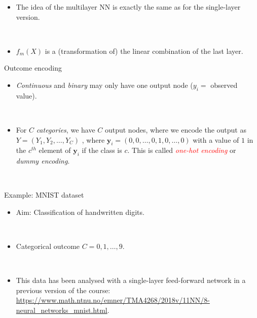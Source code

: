 \documentclass[
  10pt,
  ignorenonframetext,
  twocolumn]{beamer}
\providecommand{\tightlist}{%
  \setlength{\itemsep}{0pt}\setlength{\parskip}{0pt}}
\begin{document}
\begin{frame}
\begin{itemize}
\tightlist
\item
  The idea of the multilayer NN is exactly the same as for the
  single-layer version.
\end{itemize}

\(~\)

\begin{itemize}
\tightlist
\item
  \(f_m(X)\) is a (transformation of) the linear combination of the last
  layer.
\end{itemize}
\end{frame}

\begin{frame}
\begin{block}{Outcome encoding}
\label{outcome-encoding}
\(~\)

\begin{itemize}
\tightlist
\item
  \emph{Continuous} and \emph{binary} may only have one output node
  (\(y_i=\) observed value).
\end{itemize}

\(~\)

\begin{itemize}
\tightlist
\item
  For \(C\) \emph{categories}, we have \(C\) output nodes, where we
  encode the output as \(Y = (Y_1, Y_2, \ldots, Y_C)\) , where
  \({\boldsymbol y}_i=(0,0,\ldots,0,1,0,\ldots,0)\) with a value of
  \(1\) in the \(c^{th}\) element of \({\boldsymbol y}_i\) if the class
  is \(c\). This is called \emph{\textcolor{red}{one-hot encoding}} or
  \emph{dummy encoding}.
\end{itemize}

\(~\)
\end{block}
\end{frame}

\begin{frame}
\begin{block}{Example: MNIST dataset}
\label{example-mnist-dataset}
\(~\)

\begin{itemize}
\tightlist
\item
  Aim: Classification of handwritten digits.
\end{itemize}

\(~\)

\begin{itemize}
\tightlist
\item
  Categorical outcome \(C=0,1,\ldots,9\).
\end{itemize}

\(~\)

\begin{itemize}
\tightlist
\item
  This data has been analysed with a single-layer feed-forward network
  in a previous version of the course:
  \url{https://www.math.ntnu.no/emner/TMA4268/2018v/11NN/8-neural_networks_mnist.html}.
\end{itemize}
\end{block}
\end{frame}
\end{document}
